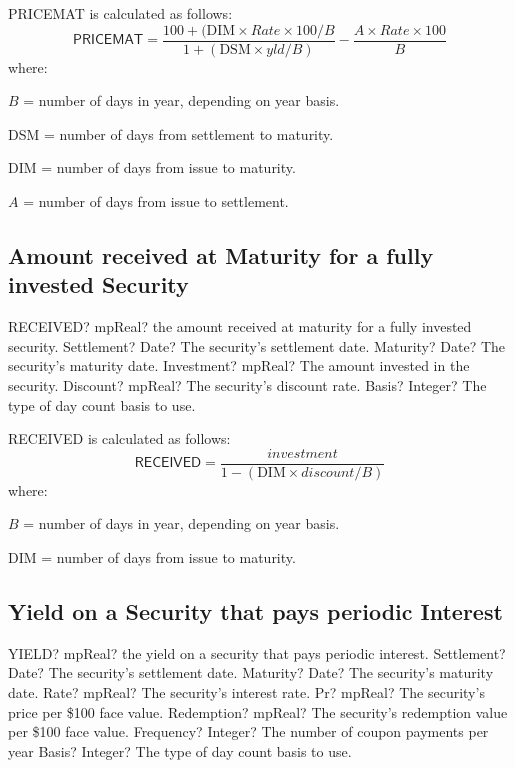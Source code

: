 \vspace{0.3cm}
PRICEMAT is calculated as follows:
\begin{equation}
	\textsf{PRICEMAT} = \frac{100 + (\text{DIM} \times Rate \times 100 / B}{1+(\text{DSM} \times yld / B)} - \frac{A \times Rate \times 100}{B}
\end{equation}
where:

$B$ = number of days in year, depending on year basis.

DSM = number of days from settlement to maturity.

DIM = number of days from issue to maturity.

$A$ = number of days from issue to settlement.




\subsection{Amount received at Maturity for a fully invested Security}

\begin{mpFunctionsExtract}
	\mpWorksheetFunctionFiveNotImplemented
	{RECEIVED? mpReal? the amount received at maturity for a fully invested security.}
	{Settlement? Date?  The security's settlement date.}
	{Maturity? Date? The security's maturity date.}
	{Investment? mpReal? The amount invested in the security.}
	{Discount? mpReal? The security's discount rate.}
	{Basis? Integer? The type of day count basis to use.}
\end{mpFunctionsExtract}

\vspace{0.3cm}
RECEIVED is calculated as follows: 
\begin{equation}
	\textsf{RECEIVED} = \frac{investment}{1-(\text{DIM} \times discount / B)} 
\end{equation}
where:

$B$ = number of days in year, depending on year basis.

DIM = number of days from issue to maturity.




\subsection{Yield on a Security that pays periodic Interest}


\begin{mpFunctionsExtract}
	\mpWorksheetFunctionSevenNotImplemented
	{YIELD? mpReal? the yield on a security that pays periodic interest.}
	{Settlement? Date?  The security's settlement date.}
	{Maturity? Date? The security's maturity date.}
	{Rate? mpReal? The security's interest rate.}
	{Pr? mpReal? The security's price per \$100 face value.}
	{Redemption? mpReal? The security's redemption value per \$100 face value.}
	{Frequency? Integer? The number of coupon payments per year}
	{Basis? Integer? The type of day count basis to use.}
\end{mpFunctionsExtract}

